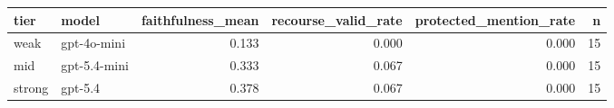 \begin{tabular}{llrrrr}
\toprule
tier & model & faithfulness_mean & recourse_valid_rate & protected_mention_rate & n \\
\midrule
weak & gpt-4o-mini & 0.133 & 0.000 & 0.000 & 15 \\
mid & gpt-5.4-mini & 0.333 & 0.067 & 0.000 & 15 \\
strong & gpt-5.4 & 0.378 & 0.067 & 0.000 & 15 \\
\bottomrule
\end{tabular}
